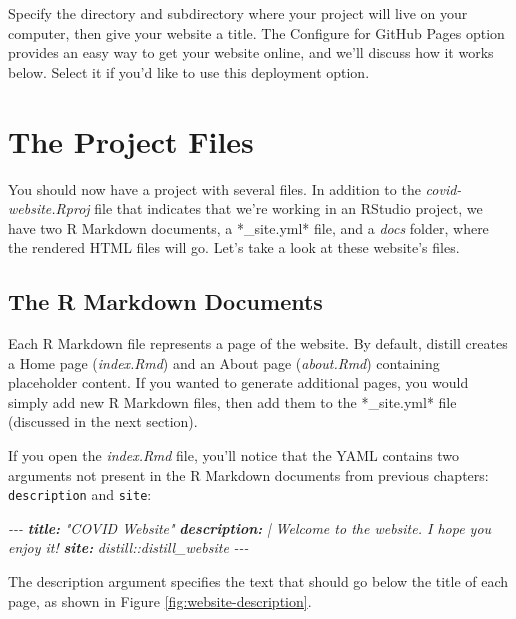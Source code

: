 \documentclass[
]{book}
\newenvironment{Shaded}{\begin{snugshade}}{\end{snugshade}}
\newcommand{\AnnotationTok}[1]{\textcolor[rgb]{0.56,0.35,0.01}{\textbf{\textit{#1}}}}
\newcommand{\CommentTok}[1]{\textcolor[rgb]{0.56,0.35,0.01}{\textit{#1}}}
\begin{document}
Specify the directory and subdirectory where your project will live on your computer, then give your website a title. The Configure for GitHub Pages option provides an easy way to get your website online, and we'll discuss how it works below. Select it if you'd like to use this deployment option.

\hypertarget{the-project-files}{%
\section*{The Project Files}\label{the-project-files}}

You should now have a project with several files. In addition to the \emph{covid-website.Rproj} file that indicates that we're working in an RStudio project, we have two R Markdown documents, a *\_site.yml* file, and a \emph{docs} folder, where the rendered HTML files will go. Let's take a look at these website's files.

\hypertarget{the-r-markdown-documents}{%
\subsection*{The R Markdown Documents}\label{the-r-markdown-documents}}

Each R Markdown file represents a page of the website. By default, distill creates a Home page (\emph{index.Rmd}) and an About page (\emph{about.Rmd}) containing placeholder content. If you wanted to generate additional pages, you would simply add new R Markdown files, then add them to the *\_site.yml* file (discussed in the next section).

If you open the \emph{index.Rmd} file, you'll notice that the YAML contains two arguments not present in the R Markdown documents from previous chapters: \texttt{description} and \texttt{site}:

\begin{Shaded}
\begin{Highlighting}[]
\CommentTok{{-}{-}{-}}
\AnnotationTok{title:}\CommentTok{ "COVID Website"}
\AnnotationTok{description:}\CommentTok{ |}
\CommentTok{  Welcome to the website. I hope you enjoy it!}
\AnnotationTok{site:}\CommentTok{ distill::distill\_website}
\CommentTok{{-}{-}{-}}
\end{Highlighting}
\end{Shaded}

The description argument specifies the text that should go below the title of each page, as shown in Figure \ref{fig:website-description}.
\end{document}
